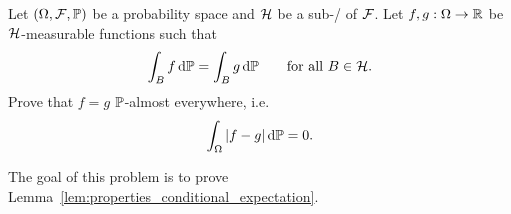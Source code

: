 \begin{problem}
Let $(\Omega, \mathcal F, \mathbb P)$ be a probability space and $\mathcal H$ be a sub-\sigalg/ of $\mathcal F$. Let $f, g : \Omega \to \mathbb R$ be $\mathcal H$-measurable functions such that
\[
	\int_B f \, \mathrm{d} \mathbb P = \int_B g \, \mathrm{d} \mathbb P\qquad\text{for all $B\in \mathcal H$}.
\]
Prove that $f=g$ $\mathbb P$-almost everywhere, i.e.
\[
	\int_\Omega |f - g| \, \mathrm{d} \mathbb P = 0.
\]
\end{problem}

%

%

\begin{problem}\label{prb:properties_conditional_expectation}
The goal of this problem is to prove Lemma~\ref{lem:properties_conditional_expectation}.
\end{problem}

